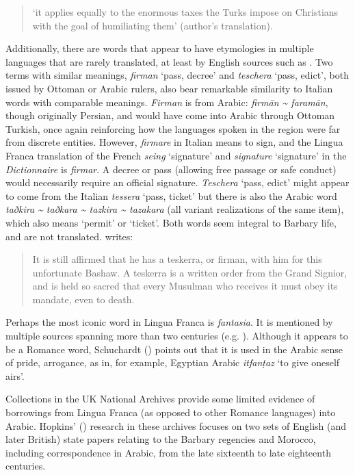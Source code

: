 \documentclass[output=paper]{langsci/langscibook}
\begin{document}
	\begin{quote}
		‘it applies equally to the enormous taxes the Turks impose on Christians with the goal of humiliating them’ (author's translation).
	\end{quote}
	
	Additionally, there are words that appear to have etymologies in multiple languages that are rarely translated, at least by English sources such as \citet{Tully1819}. Two terms with similar meanings, \textit{firman} ‘pass, decree’ and \textit{teschera} ‘pass, edict’, both issued by Ottoman or Arabic rulers, also bear remarkable similarity to Italian words with comparable meanings. \textit{Firman} is from Arabic: \textit{firmān {\textasciitilde} faramān}, though originally Persian, and would have come into Arabic through Ottoman Turkish, once again reinforcing how the languages spoken in the region were far from discrete entities. However, \textit{firmare} in Italian means to sign, and the Lingua Franca translation of the French \textit{seing} ‘signature’ and \textit{signature} ‘signature’ in the \textit{Dictionnaire} is \textit{firmar}. A decree or pass (allowing free passage or safe conduct) would necessarily require an official signature. \textit{Teschera} ‘pass, edict’ might appear to come from the Italian \textit{tessera} ‘pass, ticket’ but there is also the Arabic word \textit{taðkira {\textasciitilde} taðkara {\textasciitilde} tazkira {\textasciitilde} tazakara} (all variant realizations of the same item), which also means ‘permit’ or ‘ticket’. Both words seem integral to Barbary life, and are not translated. \citet[258]{Tully1819} writes: 
	
	\begin{quote}
		It is still affirmed that he has a teskerra, or firman, with him for this unfortunate Bashaw. A teskerra is a written order from the Grand Signior, and is held so sacred that every Musulman who receives it must obey its mandate, even to death.
	\end{quote}
	
	Perhaps the most iconic word in Lingua Franca is \textit{fantasia}. It is mentioned by multiple sources spanning more than two centuries (e.g. \citealt{Haedo1612,Broughton1839}). Although it appears to be a Romance word, Schuchardt (\citeyear[71]{Schuchardt1909}) points out that it is used in the Arabic sense of pride, arrogance, as in, for example, Egyptian Arabic \textit{itfanṭaz} ‘to give oneself airs’.
	
	Collections in the UK National Archives provide some limited evidence of borrowings from Lingua Franca (as opposed to other Romance languages) into Arabic. Hopkins' (\citeyear{Hopkins1982}) research in these archives focuses on two sets of English (and later British) state papers relating to the Barbary regencies and Morocco, including correspondence in Arabic, from the late sixteenth to late eighteenth centuries. 
	
\end{document}
